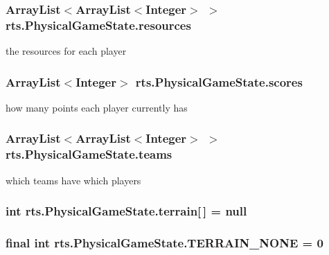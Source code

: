 \label{classrts_1_1_physical_game_state_aaf605aca11050ce864c61502afe8f023}
\hypertarget{classrts_1_1_physical_game_state_a1b39784d01283e14e116acb012030036}{
\subsubsection[{resources}]{\setlength{\rightskip}{0pt plus 5cm}ArrayList$<$ArrayList$<$Integer$>$ $>$ {\bf rts.PhysicalGameState.resources}}}
\label{classrts_1_1_physical_game_state_a1b39784d01283e14e116acb012030036}
the resources for each player \hypertarget{classrts_1_1_physical_game_state_a100aac0c47d8f32810edc443624ef951}{
\subsubsection[{scores}]{\setlength{\rightskip}{0pt plus 5cm}ArrayList$<$Integer$>$ {\bf rts.PhysicalGameState.scores}}}
\label{classrts_1_1_physical_game_state_a100aac0c47d8f32810edc443624ef951}
how many points each player currently has \hypertarget{classrts_1_1_physical_game_state_a8857fe0f0d854ccb4c49661eca1bff20}{
\subsubsection[{teams}]{\setlength{\rightskip}{0pt plus 5cm}ArrayList$<$ArrayList$<$Integer$>$ $>$ {\bf rts.PhysicalGameState.teams}}}
\label{classrts_1_1_physical_game_state_a8857fe0f0d854ccb4c49661eca1bff20}
which teams have which players \hypertarget{classrts_1_1_physical_game_state_a8e0042b4d0c50b1de4bd7bec64a4de4f}{
\subsubsection[{terrain}]{\setlength{\rightskip}{0pt plus 5cm}int {\bf rts.PhysicalGameState.terrain}\mbox{[}$\,$\mbox{]} = null}}
\label{classrts_1_1_physical_game_state_a8e0042b4d0c50b1de4bd7bec64a4de4f}
\hypertarget{classrts_1_1_physical_game_state_a786b873f5a5133fbccdf718e49b69b21}{
\subsubsection[{TERRAIN\_\-NONE}]{\setlength{\rightskip}{0pt plus 5cm}final int {\bf rts.PhysicalGameState.TERRAIN\_\-NONE} = 0}}
